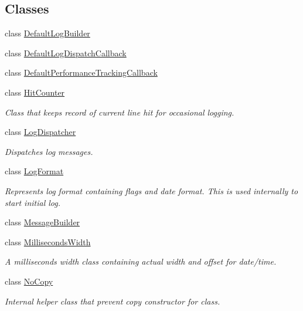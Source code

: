 \subsection*{Classes}
\begin{DoxyCompactItemize}
\item 
class \hyperlink{classel_1_1base_1_1_default_log_builder}{Default\+Log\+Builder}
\item 
class \hyperlink{classel_1_1base_1_1_default_log_dispatch_callback}{Default\+Log\+Dispatch\+Callback}
\item 
class \hyperlink{classel_1_1base_1_1_default_performance_tracking_callback}{Default\+Performance\+Tracking\+Callback}
\item 
class \hyperlink{classel_1_1base_1_1_hit_counter}{Hit\+Counter}
\begin{DoxyCompactList}\small\item\em Class that keeps record of current line hit for occasional logging. \end{DoxyCompactList}\item 
class \hyperlink{classel_1_1base_1_1_log_dispatcher}{Log\+Dispatcher}
\begin{DoxyCompactList}\small\item\em Dispatches log messages. \end{DoxyCompactList}\item 
class \hyperlink{classel_1_1base_1_1_log_format}{Log\+Format}
\begin{DoxyCompactList}\small\item\em Represents log format containing flags and date format. This is used internally to start initial log. \end{DoxyCompactList}\item 
class \hyperlink{classel_1_1base_1_1_message_builder}{Message\+Builder}
\item 
class \hyperlink{classel_1_1base_1_1_milliseconds_width}{Milliseconds\+Width}
\begin{DoxyCompactList}\small\item\em A milliseconds width class containing actual width and offset for date/time. \end{DoxyCompactList}\item 
class \hyperlink{classel_1_1base_1_1_no_copy}{No\+Copy}
\begin{DoxyCompactList}\small\item\em Internal helper class that prevent copy constructor for class. \end{DoxyCompactList}\item 

\end{DoxyCompactItemize}
